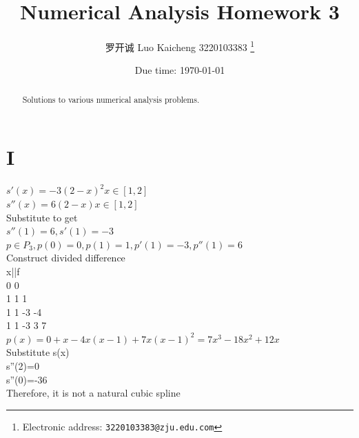 \documentclass[a4paper]{article}
\begin{document}
\title{Numerical Analysis Homework 3}

\author{罗开诚 Luo Kaicheng 3220103383
  \thanks{Electronic address: \texttt{3220103383@zju.edu.com}}}

\date{Due time: \today}

\maketitle

\begin{abstract}
    Solutions to various numerical analysis problems.
\end{abstract}


\section*{I}
$s'(x)=-3(2-x)^2 x\in [1,2]$\\
$s''(x)=6(2-x) x\in [1,2]$\\
Substitute to get\\
$s''(1)=6,s'(1)=-3$\\
$p\in P_3, p(0)=0,p(1)=1,p'(1)=-3 ,p''(1)=6$\\
Construct divided difference\\
x||f\\
0 0\\
1 1 1 \\
1 1 -3 -4\\
1 1 -3  3 7\\
$p(x)=0+x-4x(x-1)+7x(x-1)^2=7x^3-18x^2+12x$\\
Substitute s(x)\\
s''(2)=0\\
s''(0)=-36\\
Therefore, it is not a natural cubic spline\\
\end{document}
